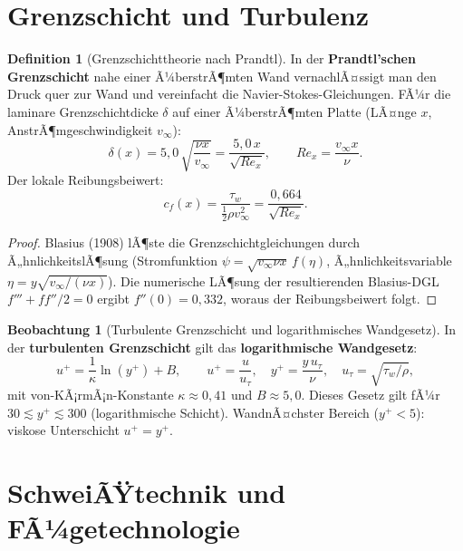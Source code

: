 ﻿\documentclass[a4paper,12pt]{report}
\theoremstyle{definition}
\newtheorem{definition}{Definition}
\newtheorem{beobachtung}{Beobachtung}
\begin{document}

\section{Grenzschicht und Turbulenz}

\begin{definition}[Grenzschichttheorie nach Prandtl]
In der \textbf{Prandtl'schen Grenzschicht} nahe einer Ã¼berstrÃ¶mten
Wand vernachlÃ¤ssigt man den Druck quer zur Wand und vereinfacht
die Navier-Stokes-Gleichungen. FÃ¼r die laminare Grenzschichtdicke
$\delta$ auf einer Ã¼berstrÃ¶mten Platte (LÃ¤nge $x$, AnstrÃ¶mgeschwindigkeit $v_\infty$):
\[
  \delta(x) = 5{,}0\,\sqrt{\frac{\nu x}{v_\infty}} = \frac{5{,}0\,x}{\sqrt{Re_x}},
  \qquad Re_x = \frac{v_\infty x}{\nu}.
\]
Der lokale Reibungsbeiwert:
\[
  c_f(x) = \frac{\tau_w}{\tfrac{1}{2}\rho v_\infty^2} = \frac{0{,}664}{\sqrt{Re_x}}.
\]
\end{definition}
\begin{proof}
Blasius (1908) lÃ¶ste die Grenzschichtgleichungen durch Ã„hnlichkeitslÃ¶sung
(Strom\-funktion $\psi = \sqrt{v_\infty\nu x}\,f(\eta)$,
Ã„hnlichkeitsvariable $\eta = y\sqrt{v_\infty/(\nu x)}$).
Die numerische LÃ¶sung der resultierenden Blasius-DGL
$f''' + ff''/2 = 0$ ergibt $f''(0) = 0{,}332$, woraus der Reibungsbeiwert folgt.
\end{proof}

\begin{beobachtung}[Turbulente Grenzschicht und logarithmisches Wandgesetz]
In der \textbf{turbulenten Grenzschicht} gilt das \textbf{logarithmische Wandgesetz}:
\[
  u^+ = \frac{1}{\kappa}\ln(y^+) + B,
  \qquad u^+ = \frac{u}{u_\tau}, \quad y^+ = \frac{y\,u_\tau}{\nu},
  \quad u_\tau = \sqrt{\tau_w/\rho},
\]
mit von-KÃ¡rmÃ¡n-Konstante $\kappa \approx 0{,}41$ und $B \approx 5{,}0$.
Dieses Gesetz gilt fÃ¼r $30 \lesssim y^+ \lesssim 300$ (logarithmische Schicht).
WandnÃ¤chster Bereich ($y^+ < 5$): viskose Unterschicht $u^+ = y^+$.
\end{beobachtung}


\section{SchweiÃŸtechnik und FÃ¼getechnologie}
\end{document}
